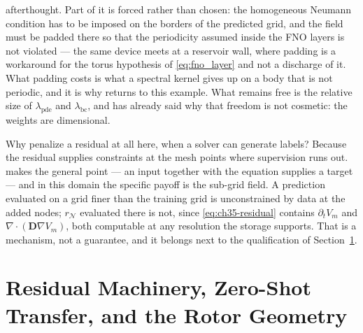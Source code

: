 afterthought. Part of it is forced rather than chosen: the homogeneous Neumann
condition has to be imposed on the borders of the predicted grid, and the field
must be padded there so that the periodicity assumed inside the FNO layers is not
violated --- the same device
 meets at a
reservoir wall,
where padding is a workaround for the torus hypothesis of \eqref{eq:fno_layer}
and not a discharge of it. What padding costs is what a spectral kernel gives up
on a body that is not periodic, and it is why
returns to this example. What remains free is the relative size of
$\lambda_{\text{pde}}$ and $\lambda_{\text{bc}}$, and
 has already said
why that freedom is not cosmetic: the weights are dimensional.

Why penalize a residual at all here, when a solver can generate labels? Because
the residual supplies constraints at the mesh points where supervision runs out.
 makes the general
point --- an input together with the equation supplies a target --- and in this
domain the specific payoff is the sub-grid field. A prediction evaluated on a
grid finer than the training grid is unconstrained by data at the added nodes;
$r_{\mathcal{N}}$ evaluated there is not, since \eqref{eq:ch35-residual} contains
$\partial_t V_m$ and $\nabla\cdot(\mathbf{D}\nabla V_m)$, both computable at any
resolution the storage supports. That is a mechanism, not a guarantee, and it
belongs next to the qualification of Section~\ref{sec:ch35-machinery}.

\section{Residual Machinery, Zero-Shot Transfer, and the Rotor Geometry}
\label{sec:ch35-machinery}

